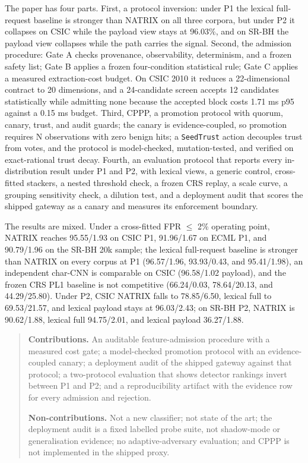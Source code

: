 \documentclass[preprint,11pt]{elsarticle}
\begin{document}
The paper has four parts. First, a protocol inversion: under P1 the
lexical full-request baseline is stronger than NATRIX on all three
corpora, but under P2 it collapses on CSIC while the payload view stays
at 96.03\%, and on SR-BH the payload view collapses while the path
carries the signal. Second, the admission procedure: Gate A checks
provenance, observability, determinism, and a frozen safety list; Gate B
applies a frozen four-condition statistical rule; Gate C applies a
measured extraction-cost budget. On CSIC 2010 it reduces a
22-dimensional contract to 20 dimensions, and a 24-candidate screen
accepts 12 candidates statistically while admitting none because the
accepted block costs 1.71 ms p95 against a 0.15 ms budget. Third, CPPP,
a promotion protocol with quorum, canary, trust, and audit guards; the
canary is evidence-coupled, so promotion requires N observations with
zero benign hits; a \texttt{Seed\allowbreak{}Trust} action decouples trust from
votes, and the protocol is model-checked, mutation-tested, and verified
on exact-rational trust decay. Fourth, an evaluation protocol that
reports every in-distribution result under P1 and P2, with lexical
views, a generic control, cross-fitted stackers, a nested threshold
check, a frozen CRS replay, a scale curve, a grouping sensitivity check,
a dilution test, and a deployment audit that scores the shipped gateway
as a canary and measures its enforcement boundary.

The results are mixed. Under a cross-fitted FPR $\le$ 2\% operating
point, NATRIX reaches 95.55/1.93 on CSIC P1, 91.96/1.67 on ECML P1, and
90.79/1.96 on the SR-BH 20k sample; the lexical full-request baseline is
stronger than NATRIX on every corpus at P1 (96.57/1.96, 93.93/0.43, and
95.41/1.98), an independent char-CNN is comparable on CSIC (96.58/1.02
payload), and the frozen CRS PL1 baseline is not competitive
(66.24/0.03, 78.64/20.13, and 44.29/25.80). Under P2, CSIC NATRIX falls
to 78.85/6.50, lexical full to 69.53/21.57, and lexical payload stays at
96.03/2.43; on SR-BH P2, NATRIX is 90.62/1.88, lexical full 94.75/2.01,
and lexical payload 36.27/1.88.

\begin{quote}
\textbf{Contributions.} An auditable feature-admission procedure with a
measured cost gate; a model-checked promotion protocol with an
evidence-coupled canary; a deployment audit of the shipped gateway
against that protocol; a two-protocol evaluation that shows detector
rankings invert between P1 and P2; and a reproducibility artifact with
the evidence row for every admission and rejection.

\textbf{Non-contributions.} Not a new classifier; not state of the art;
the deployment audit is a fixed labelled probe suite, not shadow-mode or
generalisation evidence; no adaptive-adversary evaluation; and CPPP is
not implemented in the shipped proxy.
\end{quote}
\end{document}

